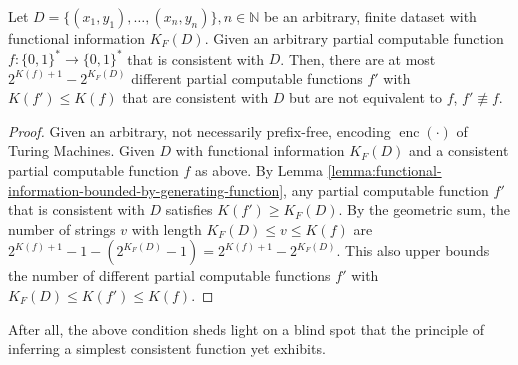 \begin{theorem}
	\label{theorem:max-alternative-simpler-consistent-functions}
	Let $D=\{(x_1,y_1),\dots,(x_n,y_n)\},n\in\mathbb{N}$ be an arbitrary, finite dataset with functional information $K_{F}(D)$.
	Given an arbitrary partial computable function $f:\{0,1\}^{*}\to\{0,1\}^{*}$ that is consistent with $D$.
	Then, there are at most $2^{K(f)+1} - 2^{K_{F}(D)}$ different partial computable functions $f'$ with $K(f')\leq K(f)$ that are consistent with $D$ but are not equivalent to $f$, $f'\not\equiv f$.
\end{theorem}
\begin{proof}
	Given an arbitrary, not necessarily prefix-free, encoding $\operatorname{enc}(\cdot)$ of Turing Machines.
	Given $D$ with functional information $K_F(D)$ and a consistent partial computable function $f$ as above.
	By Lemma \ref{lemma:functional-information-bounded-by-generating-function}, any partial computable function $f'$ that is consistent with $D$ satisfies $K(f') \geq K_F(D)$.
	By the geometric sum, the number of strings $v$ with length $K_F(D)\leq v \leq K(f)$ are 
	$2^{K(f)+1} -1 - (2^{K_{F}(D)}-1)=2^{K(f)+1}-2^{K_{F}(D)}$.
	This also upper bounds the number of different partial computable functions $f'$ with $K_F(D)\leq K(f')\leq K(f)$.
\end{proof}
After all, the above condition sheds light on a blind spot that the principle of inferring a simplest consistent function yet exhibits.

